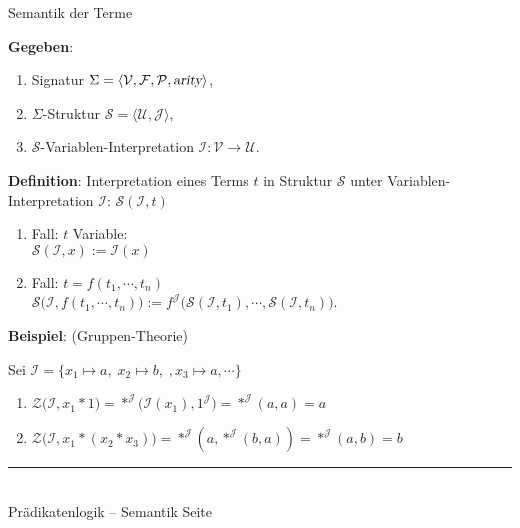\documentclass{slides}
\newcommand{\myrule}{\rule{20cm}{1mm}\\ }
\newcommand{\struct}{\mathcal{S}}
\newcounter{mypage}
\begin{document}
\begin{slide}{}
\normalsize
\begin{center}
Semantik der Terme
\end{center}
\vspace{0.5cm}

\footnotesize

\textbf{Gegeben}: 
\begin{enumerate}
\item Signatur $\Sigma = \langle \mathcal{V}, \mathcal{F}, \mathcal{P}, \textsl{arity} \rangle$,
\item $\Sigma$-Struktur $\struct = \langle \mathcal{U}, \mathcal{J} \rangle$,
\item $\struct$-Variablen-Interpretation $\mathcal{I}: \mathcal{V} \rightarrow \mathcal{U}$.
\end{enumerate}

\textbf{Definition}: Interpretation eines Terms $t$ in Struktur $\mathcal{S}$ unter
Variablen-Interpretation $\mathcal{I}$:  $\struct(\mathcal{I}, t)$
\begin{enumerate}
\item Fall: $t$ Variable: \\[0.3cm]
      \hspace*{1.3cm} $\struct(\mathcal{I}, x) := \mathcal{I}(x)$
\item Fall: $t = f(t_1,\cdots,t_n)$  \\[0.3cm]
      \hspace*{1.3cm} $\struct\Bigg(\mathcal{I}, f(t_1,\cdots,t_n)\Bigg) := 
                       f^\mathcal{J}\Bigg( \struct(\mathcal{I}, t_1), \cdots, \struct(\mathcal{I}, t_n) \Bigg)$.
\end{enumerate}

\textbf{Beispiel}: (Gruppen-Theorie) 

Sei $\mathcal{I} = \{ x_1 \mapsto a, \; x_2 \mapsto b, \;, x_3 \mapsto a, \cdots \}$ 
\begin{enumerate}
\item $\mathcal{Z}\Bigg(\mathcal{I}, x_1 * 1\Bigg) = *^\mathcal{J}\Bigg(\mathcal{I}(x_1), 1^\mathcal{J}\Bigg) = *^\mathcal{J}(a, a) = a$
\item $\mathcal{Z}\Bigg(\mathcal{I}, x_1 * (x_2 * x_3)\Bigg) = *^\mathcal{J}(a, *^\mathcal{J}(b,a)) = *^\mathcal{J}(a, b) = b$
\end{enumerate}

\vspace*{\fill}
\tiny \addtocounter{mypage}{1}
\myrule
Pr\"{a}dikatenlogik -- Semantik  \hspace*{\fill} Seite 
\end{slide}
\end{document}
